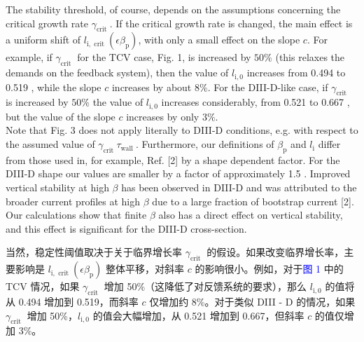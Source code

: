 \documentclass[utf8]{ctexart}
\newcommand\enzhbox[2]{
  	\quad\par \begin{paracol}{2} \colseprulecolor{black} 
  		\begin{spacing}{1.0}
  			\footnotesize  #1
  		\end{spacing}
  		\switchcolumn[1] 
  		#2
  	\end{paracol} \quad\par
  }
\begin{document}
\begin{sloppypar}
 
\enzhbox{  The stability threshold, of course, depends on the assumptions concerning the critical growth rate $\gamma_{\text {crit }}$. If the critical growth rate is changed, the main effect is a uniform shift of $l_{\mathrm{i}, \text { crit }}\left(\epsilon \beta_{\mathrm{p}}\right)$, with only a small effect on the slope $c$. For example, if $\gamma_{\text {crit }}$ for the TCV case, Fig. 1, is increased by $50 \%$ (this relaxes the demands on the feedback system), then the value of $l_{\mathrm{i}, 0}$ increases from 0.494 to 0.519 , while the slope $c$ increases by about $8 \%$. For the DIII-D-like case, if $\gamma_{\text {crit }}$ is increased by $50 \%$ the value of $l_{\mathrm{i}, 0}$ increases considerably, from 0.521 to 0.667 , but the value of the slope $c$ increases by only $3 \%$.\\ Note that Fig. 3 does not apply literally to DIII-D conditions, e.g. with respect to the assumed value of $\gamma_{\text {crit }} \tau_{\text {wall }}$. Furthermore, our definitions of $\beta_{\mathrm{p}}$ and $l_{\mathrm{i}}$ differ from those used in, for example, Ref. \textcolor{green!50!black}{[2]} by a shape dependent factor. For the DIII-D shape our values are smaller by a factor of approximately 1.5 . Improved vertical stability at high $\beta$ has been observed in DIII-D and was attributed to the broader current profiles at high $\beta$ due to a large fraction of bootstrap current \textcolor{green!50!black}{[2]}. Our calculations show that finite $\beta$ also has a direct effect on vertical stability, and this effect is significant for the DIII-D cross-section.}{
当然，稳定性阈值取决于关于临界增长率 $\gamma_{\text {crit }}$ 的假设。如果改变临界增长率，主要影响是 $l_{\mathrm{i}, \text { crit }}(\epsilon \beta_{\mathrm{p}})$ 整体平移，对斜率 $c$ 的影响很小。例如，对于\textcolor{blue}{图 1} 中的 TCV 情况，如果 $\gamma_{\text {crit }}$ 增加 50\%（这降低了对反馈系统的要求），那么 $l_{\mathrm{i}, 0}$ 的值将从 0.494 增加到 0.519，而斜率 $c$ 仅增加约 8\%。对于类似 DIII - D 的情况，如果 $\gamma_{\text {crit }}$ 增加 50\%，$l_{\mathrm{i}, 0}$ 的值会大幅增加，从 0.521 增加到 0.667，但斜率 $c$ 的值仅增加 3\%。

}
\end{sloppypar}
\end{document}
